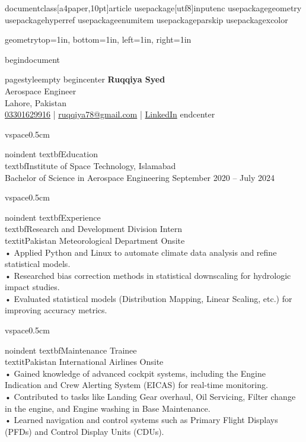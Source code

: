documentclass[a4paper,10pt]{article}
usepackage[utf8]{inputenc}
usepackage{geometry}
usepackage{hyperref}
usepackage{enumitem}
usepackage{parskip}
usepackage{xcolor}

geometry{top=1in, bottom=1in, left=1in, right=1in}

begin{document}

pagestyle{empty}
begin{center}
    \textbf{\Huge Ruqqiya Syed} \\
    Aerospace Engineer \\
    Lahore, Pakistan \\
    \href{tel:+923301629916}{03301629916} \quad | \quad \href{mailto:ruqqiya78@gmail.com}{ruqqiya78@gmail.com} \quad | \quad \href{https://www.linkedin.com/in/ruqqiya-syed}{LinkedIn}
end{center}

vspace{0.5cm}

noindent
textbf{\large Education} \\
textbf{Institute of Space Technology}, Islamabad \\
Bachelor of Science in Aerospace Engineering \hfill September 2020 – July 2024

vspace{0.5cm}

noindent
textbf{\large Experience} \\
textbf{Research and Development Division Intern} \\
textit{Pakistan Meteorological Department} \hfill Onsite \\
• Applied Python and Linux to automate climate data analysis and refine statistical models. \\
• Researched bias correction methods in statistical downscaling for hydrologic impact studies. \\
• Evaluated statistical models (Distribution Mapping, Linear Scaling, etc.) for improving accuracy metrics.

vspace{0.5cm}

noindent
textbf{Maintenance Trainee} \\
textit{Pakistan International Airlines} \hfill Onsite \\
• Gained knowledge of advanced cockpit systems, including the Engine Indication and Crew Alerting System (EICAS) for real-time monitoring. \\
• Contributed to tasks like Landing Gear overhaul, Oil Servicing, Filter change in the engine, and Engine washing in Base Maintenance. \\
• Learned navigation and control systems such as Primary Flight Displays (PFDs) and Control Display Units (CDUs).

